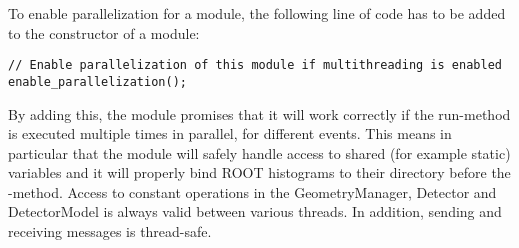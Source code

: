 To enable parallelization for a module, the following line of code has to be added to the constructor of a module:
\begin{verbatim}
// Enable parallelization of this module if multithreading is enabled
enable_parallelization();
\end{verbatim}
By adding this, the module promises that it will work correctly if the run-method is executed multiple times in parallel, for different events.
This means in particular that the module will safely handle access to shared (for example static) variables and it will properly bind ROOT histograms to their directory before the -method.
Access to constant operations in the GeometryManager, Detector and DetectorModel is always valid between various threads. In addition, sending and receiving messages is thread-safe.

